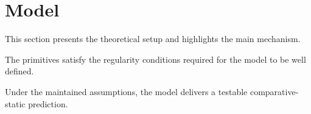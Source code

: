 \section{Model} \label{sec:model}

This section presents the theoretical setup and highlights the main mechanism.

\begin{assumption}
The primitives satisfy the regularity conditions required for the model to be well defined.
\end{assumption}

\begin{prop}
Under the maintained assumptions, the model delivers a testable comparative-static prediction.
\end{prop}
